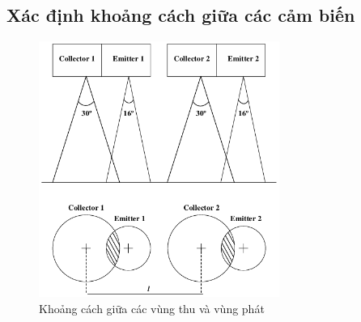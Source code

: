         \subsection{Xác định khoảng cách giữa các cảm biến}
            \begin{figure}[H]
                \centering
                \includegraphics[width=0.7\textwidth]{pictures/chapter4/c4_p7_DistanceCollectorEmitter.png}
                \caption{Khoảng cách giữa các vùng thu và vùng phát}
                \label{fig:4-6}
            \end{figure}
            

            